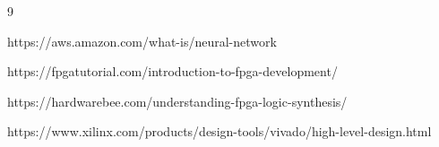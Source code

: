 \documentclass{report}
\begin{document}
\begin{thebibliography}{9}

https://aws.amazon.com/what-is/neural-network

https://fpgatutorial.com/introduction-to-fpga-development/

https://hardwarebee.com/understanding-fpga-logic-synthesis/

https://www.xilinx.com/products/design-tools/vivado/high-level-design.html
\end{thebibliography}
\end{document}

